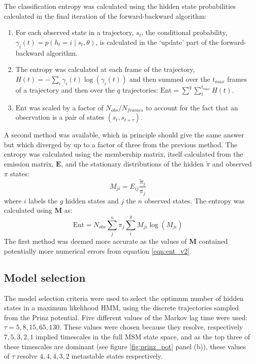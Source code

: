 The classification entropy was calculated using the hidden state probabilities calculated in the final iteration of the forward-backward algorithm: 
\begin{enumerate}
    \item For each observed state in a trajectory, $s_t$, the conditional probability, $\gamma_{i}(t)=p\left(h_{t}=i \mid s_t, \theta\right)$, is calculated in the `update' part of the forward-backward algorithm. 
    \item The entropy was calculated at each frame of the trajectory,  $H(t)=-\sum_{i}\gamma_{i}(t)\log{\left(\gamma_{i}(t)\right)}$ and then summed over the $t_{max}$ frames of a trajectory and then over the $q$ trajectories: $\mathrm{Ent} = \sum^{q} \sum_{t}^{t_{max}} H(t)$.
    \item $\mathrm{Ent}$ was scaled by a factor of $N_{obs}/N_{frames}$ to account for the fact that an observation is a pair of states $(s_{t}, s_{t+\tau})$.
\end{enumerate}
A second method was available, which in principle should give the same answer but which diverged by up to a factor of three from the previous method. The entropy was calculated using the membership matrix, itself calculated from the emission matrix, $\mathbf{E}$, and the stationary distributions of the hidden $\tilde{\pi}$ and observed $\pi$ states: 
\begin{equation}
    M_{ji} = E_{ij}\frac{\tilde{\pi}_{i}}{\pi_{j}}
\end{equation}
where $i$ labels the $g$ hidden states and $j$ the $n$ observed states. The entropy was calculated using $\mathbf{M}$ as: 
\begin{equation}\label{eqn:ent_v2}
    \mathrm{Ent} = N_{obs}\sum^{n}_{j}\pi_{j}\sum^{g}_{i} M_{ji}\log{\left(M_{ji}\right)}
\end{equation}
The first method was deemed more accurate as the values of $\mathbf{M}$ contained potentially more numerical errors from equation \ref{eqn:ent_v2}. 

\subsection{Model selection}
The model selection criteria were used to select the optimum number of hidden states in a maximum likelihood HMM, using the discrete trajectories sampled from the Prinz potential. Five different values of the Markov lag time were used: $\tau=5, 8, 15, 65, 130$. These values were chosen because they resolve, respectively $7, 5, 3, 2, 1$ implied timescales in the full MSM state space, and as the top three of these timescales are dominant (see figure \ref{fig:prinz_pot} panel (b)), these values of $\tau$ resolve $4, 4, 4, 3, 2$ metastable states \cite{noeProjectedHiddenMarkov2013a} respectively. 

